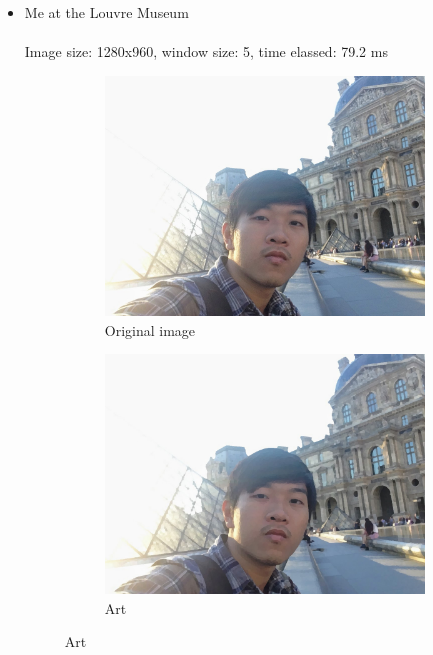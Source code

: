 \documentclass[12pt]{article}
\begin{document}
\begin{itemize}
  \item Me at the Louvre Museum
  \\\\
  Image size: 1280x960, window size: 5, time elassed: 79.2 ms

  \begin{figure}[H]
    \centering
    \begin{subfigure}{.45\textwidth}
      \includegraphics[width=\linewidth]{./img/1_in.jpg}
      \caption{Original image}
    \end{subfigure}
    \hspace{1cm}
    \begin{subfigure}{.45\textwidth}
      \includegraphics[width=\linewidth]{./img/1_out.jpg}
      \caption{Art}
    \end{subfigure}
  \end{figure}


\end{itemize}
\end{document}
